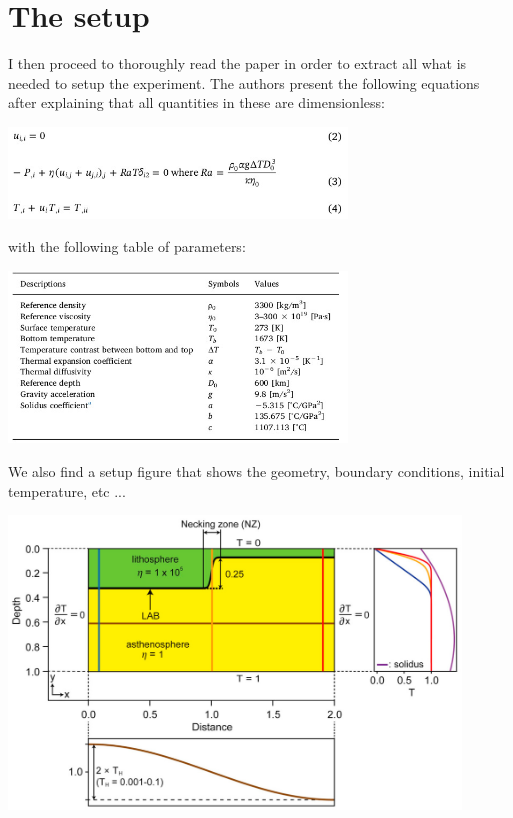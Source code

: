 \section*{The setup}

I then proceed to thoroughly read the paper in order to extract all what is needed to setup 
the experiment. 
The authors present the following equations after explaining that all quantities in these
are dimensionless:
\begin{center}
\includegraphics[width=9cm]{python_codes/fieldstone_168/images/kiso20c.jpg}
\end{center}
with the following table of parameters:
\begin{center}
\includegraphics[width=9cm]{python_codes/fieldstone_168/images/kiso20a.jpg}
\end{center}
We also find a setup figure that shows the geometry, 
boundary conditions, initial temperature, etc ...
\begin{center}
\includegraphics[width=12cm]{python_codes/fieldstone_168/images/kiso20b.jpg}
\end{center}

